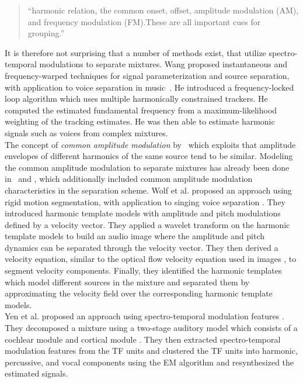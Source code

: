 \begin{quote}
``harmonic relation, the common onset, offset, amplitude modulation (AM), and frequency modulation (FM).These are all important cues for grouping.''
\end{quote}

It is therefore not surprising that a number of methods exist, that utilize spectro-temporal modulations to separate mixtures.
Wang proposed instantaneous and frequency-warped techniques for signal parameterization and source separation, with application to voice separation in music~\cite{wang94,wang95}.
He introduced a frequency-locked loop algorithm which uses multiple harmonically constrained trackers.
He computed the estimated fundamental frequency from a maximum-likelihood weighting of the tracking estimates. He was then able to estimate harmonic signals such as voices from complex mixtures.\\
The concept of \emph{common amplitude modulation} by~\cite{bregman, wang06} which exploits that amplitude envelopes of different harmonics of the same source tend to be similar.
Modeling the common amplitude modulation to separate mixtures has already been done in~\cite{li07, li09} and \cite{cano14}, which additionally included common amplitude modulation characteristics in the separation scheme.
Wolf et al. proposed an approach using rigid motion segmentation, with application to singing voice separation \cite{wolf14,wolf16}. They introduced harmonic template models with amplitude and pitch modulations defined by a velocity vector. They applied a wavelet transform \cite{anden14} on the harmonic template models to build an audio image where the amplitude and pitch dynamics can be separated through the velocity vector. They then derived a velocity equation, similar to the optical flow velocity equation used in images \cite{bernard01}, to segment velocity components. Finally, they identified the harmonic templates which model different sources in the mixture and separated them by approximating the velocity field over the corresponding harmonic template models.\\
Yen et al. proposed an approach using spectro-temporal modulation features \cite{yen14,yen15}. They decomposed a mixture using a two-stage auditory model which consists of a cochlear module \cite{chi05} and cortical module \cite{chi99}. They then extracted spectro-temporal modulation features from the TF units and clustered the TF units into harmonic, percussive, and vocal components using the EM algorithm and resynthesized the estimated signals.\\
